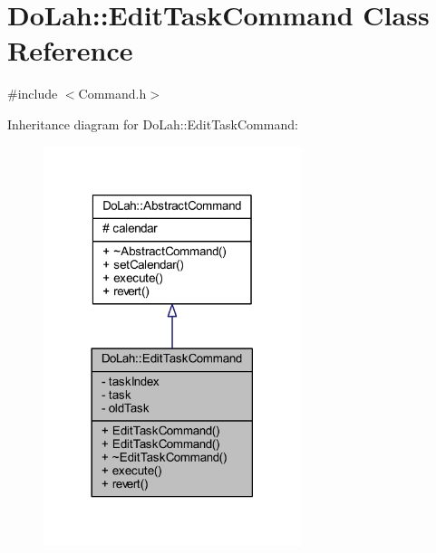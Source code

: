 \hypertarget{class_do_lah_1_1_edit_task_command}{}\section{Do\+Lah\+:\+:Edit\+Task\+Command Class Reference}
\label{class_do_lah_1_1_edit_task_command}


{\ttfamily \#include $<$Command.\+h$>$}



Inheritance diagram for Do\+Lah\+:\+:Edit\+Task\+Command\+:\nopagebreak
\begin{figure}[H]
\begin{center}
\leavevmode
\includegraphics[width=213pt]{class_do_lah_1_1_edit_task_command__inherit__graph}
\end{center}
\end{figure}


